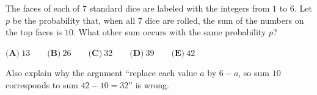 The faces of each of $7$ standard dice are labeled with the integers from $1$ to $6$. Let $p$ be the probability that, when all $7$ dice are rolled, the sum of the numbers on the top faces is $10$. What other sum occurs with the same probability $p$?

$\textbf{(A)}\ 13\qquad\textbf{(B)}\ 26\qquad\textbf{(C)}\ 32\qquad\textbf{(D)}\ 39\qquad\textbf{(E)}\ 42$

Also explain why the argument ``replace each value $a$ by $6-a$, so sum $10$ corresponds to sum $42-10=32$'' is wrong.
